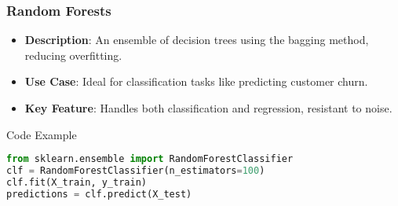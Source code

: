 \documentclass[aspectratio=169]{beamer}
\begin{document}
\begin{frame}[fragile]
    \frametitle{Random Forests}
    \begin{itemize}
        \item \textbf{Description}: An ensemble of decision trees using the bagging method, reducing overfitting.
        \item \textbf{Use Case}: Ideal for classification tasks like predicting customer churn.
        \item \textbf{Key Feature}: Handles both classification and regression, resistant to noise.
    \end{itemize}
    \begin{block}{Code Example}
        \begin{lstlisting}[language=Python]
from sklearn.ensemble import RandomForestClassifier
clf = RandomForestClassifier(n_estimators=100)
clf.fit(X_train, y_train)
predictions = clf.predict(X_test)
        \end{lstlisting}
    \end{block}
\end{frame}
\end{document}
